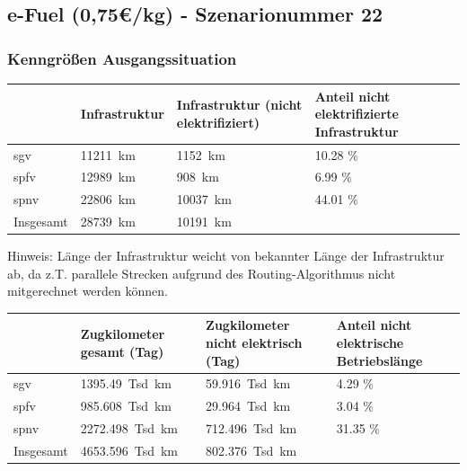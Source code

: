 \subsection{e-Fuel (0,75€/kg) - Szenarionummer 22}\label{chap_kenngrößen_s_22}

\subsubsection{Kenngrößen Ausgangssituation}
\begin{center}
	\begin{tabularx}{\textwidth}{l | X | X | X} & Infrastruktur & Infrastruktur (nicht elektrifiziert) & Anteil nicht elektrifizierte Infrastruktur \\
	\hline
	\acrshort{sgv} & \SI{11211}{\km} & \SI{1152}{\km} & \num{10.28} \% \\
	\acrshort{spfv} & \SI{12989}{\km} & \SI{908}{\km} & \num{6.99} \% \\
	\acrshort{spnv} & \SI{22806}{\km} & \SI{10037}{\km} & \num{44.01} \% \\
	\hline
	Insgesamt & \SI{28739}{\km} & \SI{10191}{\km} & \\
	\end{tabularx}
\end{center}
\hspace{2em}

Hinweis: Länge der Infrastruktur weicht von bekannter Länge der Infrastruktur ab, da z.T. parallele Strecken aufgrund des Routing-Algorithmus nicht mitgerechnet werden können.

\begin{center}
	\begin{tabularx}{\textwidth}{l | X | X | X} & Zugkilometer gesamt (Tag) & Zugkilometer nicht elektrisch (Tag) & Anteil nicht elektrische Betriebslänge \\
	\hline
	\acrshort{sgv} & \SI{1395.49}{Tsd. \km} & \SI{59.916}{Tsd. \km} & \num{4.29}  \% \\
	\acrshort{spfv} & \SI{985.608}{Tsd. \km} & \SI{29.964}{Tsd. \km} & \num{3.04} \% \\
	\acrshort{spnv} & \SI{2272.498}{Tsd. \km} & \SI{712.496}{Tsd. \km} & \num{31.35} \% \\
	\hline
	Insgesamt & \SI{4653.596}{Tsd. \km} & \SI{802.376}{Tsd. \km} & \\
	\end{tabularx}
\end{center}


